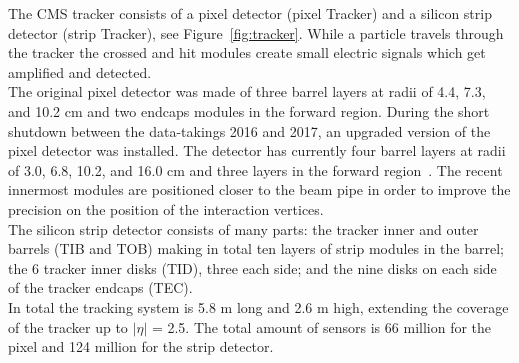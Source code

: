 The CMS tracker consists of a pixel detector (pixel Tracker) and a
silicon strip detector (strip Tracker), see
Figure~\ref{fig:tracker}. While a particle travels through the tracker
the crossed and hit modules create small electric signals which get amplified and
detected.\\
The original pixel detector was made of three barrel
layers at radii of 4.4, 7.3, and 10.2 cm and two endcaps modules in
the forward region. 
During the short shutdown between the data-takings 2016 and 2017, 
an
upgraded version of the pixel detector was installed. The detector has currently four
barrel layers at radii of 3.0, 6.8, 10.2, and
16.0 cm and three layers in the forward region~\cite{Dominguez:1481838}. The
recent innermost modules
are positioned closer to the beam pipe in order to improve the
precision on the position of the interaction vertices.\\
The silicon strip detector consists of many parts: the tracker inner and
outer barrels (TIB and TOB) making in total ten layers of strip modules in
the barrel; the 6 tracker inner disks (TID), three each
side; and the nine disks on each side of the tracker endcaps (TEC).\\
In total the tracking system is 5.8 m long and 2.6 m high,
extending the coverage of the tracker up to $|\eta|$ = 2.5. The total
amount of sensors is 66 million for the pixel and 124 million for the
strip detector. 

